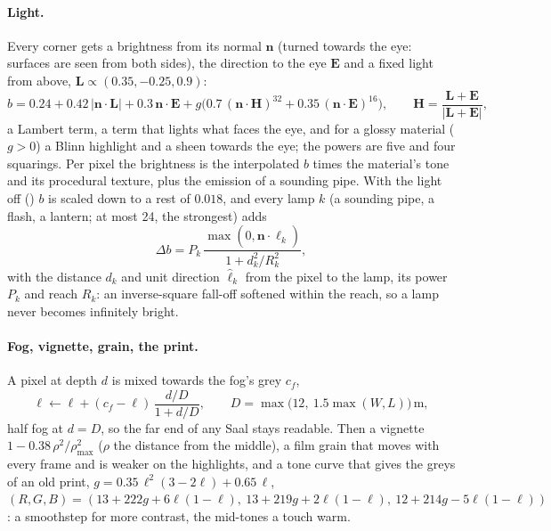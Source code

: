 \paragraph{Light.} Every corner gets a brightness from its normal $\mathbf n$ (turned towards the eye: surfaces are
seen from both sides), the direction to the eye $\mathbf E$ and a fixed light from above, $\mathbf L \propto
(0.35, -0.25, 0.9)$:
\begin{equation}
  b = 0.24 + 0.42\,|\mathbf n\cdot\mathbf L| + 0.3\,\mathbf n\cdot\mathbf E
      + g\bigl(0.7\,(\mathbf n\cdot\mathbf H)^{32} + 0.35\,(\mathbf n\cdot\mathbf E)^{16}\bigr),
  \qquad \mathbf H = \frac{\mathbf L+\mathbf E}{|\mathbf L+\mathbf E|},
\end{equation}
a Lambert term, a term that lights what faces the eye, and for a glossy material ($g>0$) a Blinn highlight and a sheen
towards the eye; the powers are five and four squarings. Per pixel the brightness is the interpolated $b$ times the
material's tone and its procedural texture, plus the emission of a sounding pipe. With the light off () $b$ is
scaled down to a rest of $0.018$, and every lamp $k$ (a sounding pipe, a flash, a lantern; at most 24, the strongest)
adds
\begin{equation}
  \Delta b = P_k\,\frac{\max(0, \mathbf n\cdot\hat{\boldsymbol\ell}_k)}{1 + d_k^2/R_k^2},
\end{equation}
with the distance $d_k$ and unit direction $\hat{\boldsymbol\ell}_k$ from the pixel to the lamp, its power $P_k$ and
reach $R_k$: an inverse-square fall-off softened within the reach, so a lamp never becomes infinitely bright.

\paragraph{Fog, vignette, grain, the print.} A pixel at depth $d$ is mixed towards the fog's grey $c_f$,
\begin{equation}
  \ell \leftarrow \ell + (c_f-\ell)\,\frac{d/D}{1+d/D},\qquad D = \max\bigl(12,\ 1.5\max(W, L)\bigr)\,\mathrm m,
\end{equation}
half fog at $d = D$, so the far end of any Saal stays readable. Then a vignette $1 - 0.38\,\rho^2/\rho_{\max}^2$
($\rho$ the distance from the middle), a film grain that moves with every frame and is weaker on the highlights,
and a tone curve that gives the greys of an old print,
$g = 0.35\,\ell^2(3-2\ell) + 0.65\,\ell$, $(R,G,B) = (13 + 222g + 6\ell(1-\ell),\ 13 + 219g + 2\ell(1-\ell),\ 12 + 214g -
5\ell(1-\ell))$: a smoothstep for more contrast, the mid-tones a touch warm.

